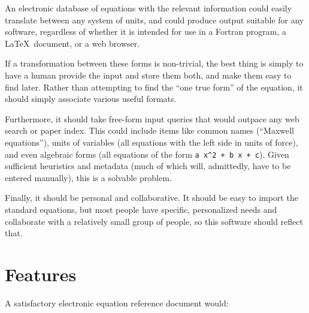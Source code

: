 \documentclass[12pt,letterpaper]{article}
\begin{document}
An electronic database of equations with the relevant information could easily translate between any system of units, and could produce output suitable for any software, regardless of whether it is intended for use in a Fortran program, a \LaTeX\ document, or a web browser.

If a transformation between these forms is non-trivial, the best thing is simply to have a human provide the input and store them both, and make them easy to find later. Rather than attempting to find the ``one true form'' of the equation, it should simply associate various useful formats.

Furthermore, it should take free-form input queries that would outpace any web search or paper index. This could include items like common names (``Maxwell equations''), units of variables (all equations with the left side in units of force), and even algebraic forms (all equations of the form \verb|a x^2 + b x + c|). Given sufficient heuristics and metadata (much of which will, admittedly, have to be entered manually), this is a solvable problem.

Finally, it should be personal and collaborative. It should be easy to import the standard equations, but most people have specific, personalized needs and collaborate with a relatively small group of people, so this software should reflect that.

\section{Features}

\label{features}

A satisfactory electronic equation reference document would:
\end{document}

